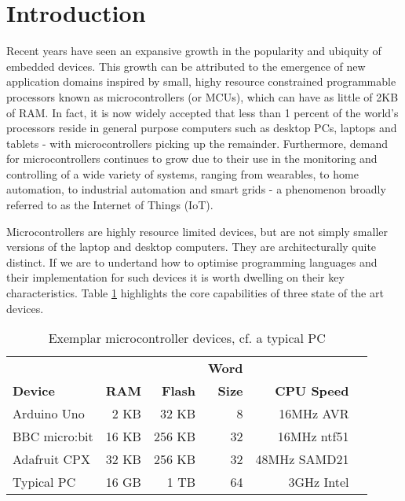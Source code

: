 \section{Introduction}
\label{sec:intro}

Recent years have seen an expansive growth in the popularity and ubiquity of embedded devices. 
This growth can be attributed to the emergence of new application domains inspired by small, 
highy resource constrained programmable processors known as microcontrollers (or MCUs), 
which can have as little of 2KB of RAM. In fact, it is now 
widely accepted  that less than 1 percent of the world's processors reside in general purpose 
computers such as desktop PCs, laptops and tablets - with microcontrollers picking up the remainder.
Furthermore, demand for microcontrollers continues to grow due to their use in the monitoring and 
controlling of a wide variety of systems, ranging from wearables, to home automation, to 
industrial automation and smart grids - a phenomenon broadly referred to as the Internet of Things (IoT).

Microcontrollers are highly resource limited devices, but are not simply smaller versions of the laptop 
and desktop computers. They are architecturally quite distinct. If we are to undertand how to optimise 
programming languages and their implementation for such devices it is worth dwelling on their key characteristics. 
Table \ref{table:devices} highlights the core capabilities of three state of the art devices. 

\begin{table}[]
    \centering
    \begin{tabular}{|l|r|r|r|r|r|}
    \hline
                           &          &              & \bf{Word}  &                 \\
    \bf{Device}            & \bf{RAM} & \bf{Flash}   & \bf{Size}  & \bf{CPU Speed}  \\ \hline
    Arduino Uno            & 2 KB       & 32 KB      & 8          & 16MHz AVR       \\ \hline
    BBC micro:bit          & 16 KB      & 256 KB     & 32         & 16MHz ntf51     \\ \hline
    Adafruit CPX           & 32 KB      & 256 KB     & 32         & 48MHz SAMD21    \\ \hline
    Typical PC             & 16 GB      & 1 TB       & 64         & 3GHz Intel      \\ \hline
    \end{tabular}
    \caption{\label{table:devices}Exemplar microcontroller devices, cf. a typical PC}
    \end{table}


